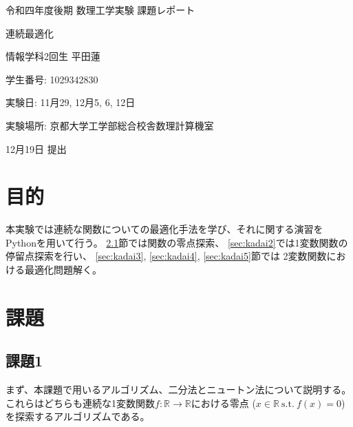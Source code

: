 \documentclass[a4j, titlepage]{jsarticle}
\numberwithin{equation}{section}
\begin{document}
\begin{titlepage}
    \begin{center}
        {\Large 令和四年度後期 数理工学実験 課題レポート}

        \vspace*{180truept}

        {\Huge 連続最適化}

        \vspace{160truept}

        {\Large 情報学科2回生 平田蓮}

        \vspace{10truept}

        {\large 学生番号: 1029342830}

        \vspace{60truept}

        {\large 実験日: 11月29, 12月5, 6, 12日}

        \vspace{10truept}

        {\large 実験場所: 京都大学工学部総合校舎数理計算機室}

        \vspace{60truept}

        {\large 12月19日 提出}
    \end{center}
\end{titlepage}

\tableofcontents
\clearpage

\section{目的}
    本実験では連続な関数についての最適化手法を学び、それに関する演習をPythonを用いて行う。
    \ref{sec:kadai1}節では関数の零点探索、
    \ref{sec:kadai2}では1変数関数の停留点探索を行い、
    \ref{sec:kadai3}, \ref{sec:kadai4}, \ref{sec:kadai5}節では
    2変数関数における最適化問題解く。

\section{課題}
    \subsection{課題1} \label{sec:kadai1}
        まず、本課題で用いるアルゴリズム、二分法とニュートン法について説明する。
        これらはどちらも連続な1変数関数$f: \mathbb{R} \rightarrow \mathbb{R}$における零点
        ($x \in \mathbb{R} \ \mathrm{s.t.} \ f(x)=0$)
        を探索するアルゴリズムである。
\end{document}
